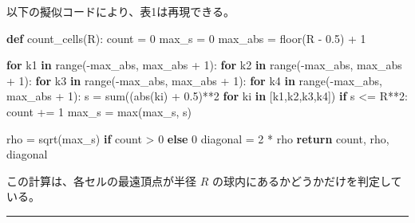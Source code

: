 \documentclass[
]{ltjsarticle}
\newenvironment{Shaded}{}{}
\newcommand{\BuiltInTok}[1]{\textcolor[rgb]{0.00,0.50,0.00}{#1}}
\newcommand{\ControlFlowTok}[1]{\textcolor[rgb]{0.00,0.44,0.13}{\textbf{#1}}}
\newcommand{\DecValTok}[1]{\textcolor[rgb]{0.25,0.63,0.44}{#1}}
\newcommand{\FloatTok}[1]{\textcolor[rgb]{0.25,0.63,0.44}{#1}}
\newcommand{\KeywordTok}[1]{\textcolor[rgb]{0.00,0.44,0.13}{\textbf{#1}}}
\newcommand{\NormalTok}[1]{#1}
\newcommand{\OperatorTok}[1]{\textcolor[rgb]{0.40,0.40,0.40}{#1}}
\begin{document}
以下の擬似コードにより、表1は再現できる。

\begin{Shaded}
\begin{Highlighting}[]
\KeywordTok{def}\NormalTok{ count\_cells(R):}
\NormalTok{    count }\OperatorTok{=} \DecValTok{0}
\NormalTok{    max\_s }\OperatorTok{=} \DecValTok{0}
\NormalTok{    max\_abs }\OperatorTok{=}\NormalTok{ floor(R }\OperatorTok{{-}} \FloatTok{0.5}\NormalTok{) }\OperatorTok{+} \DecValTok{1}

    \ControlFlowTok{for}\NormalTok{ k1 }\KeywordTok{in} \BuiltInTok{range}\NormalTok{(}\OperatorTok{{-}}\NormalTok{max\_abs, max\_abs }\OperatorTok{+} \DecValTok{1}\NormalTok{):}
      \ControlFlowTok{for}\NormalTok{ k2 }\KeywordTok{in} \BuiltInTok{range}\NormalTok{(}\OperatorTok{{-}}\NormalTok{max\_abs, max\_abs }\OperatorTok{+} \DecValTok{1}\NormalTok{):}
        \ControlFlowTok{for}\NormalTok{ k3 }\KeywordTok{in} \BuiltInTok{range}\NormalTok{(}\OperatorTok{{-}}\NormalTok{max\_abs, max\_abs }\OperatorTok{+} \DecValTok{1}\NormalTok{):}
          \ControlFlowTok{for}\NormalTok{ k4 }\KeywordTok{in} \BuiltInTok{range}\NormalTok{(}\OperatorTok{{-}}\NormalTok{max\_abs, max\_abs }\OperatorTok{+} \DecValTok{1}\NormalTok{):}
\NormalTok{            s }\OperatorTok{=} \BuiltInTok{sum}\NormalTok{((}\BuiltInTok{abs}\NormalTok{(ki) }\OperatorTok{+} \FloatTok{0.5}\NormalTok{)}\OperatorTok{**}\DecValTok{2} \ControlFlowTok{for}\NormalTok{ ki }\KeywordTok{in}\NormalTok{ [k1,k2,k3,k4])}
            \ControlFlowTok{if}\NormalTok{ s }\OperatorTok{\textless{}=}\NormalTok{ R}\OperatorTok{**}\DecValTok{2}\NormalTok{:}
\NormalTok{                count }\OperatorTok{+=} \DecValTok{1}
\NormalTok{                max\_s }\OperatorTok{=} \BuiltInTok{max}\NormalTok{(max\_s, s)}

\NormalTok{    rho }\OperatorTok{=}\NormalTok{ sqrt(max\_s) }\ControlFlowTok{if}\NormalTok{ count }\OperatorTok{\textgreater{}} \DecValTok{0} \ControlFlowTok{else} \DecValTok{0}
\NormalTok{    diagonal }\OperatorTok{=} \DecValTok{2} \OperatorTok{*}\NormalTok{ rho}
    \ControlFlowTok{return}\NormalTok{ count, rho, diagonal}
\end{Highlighting}
\end{Shaded}

この計算は、各セルの最遠頂点が半径 \(R\)
の球内にあるかどうかだけを判定している。

\begin{center}\rule{0.5\linewidth}{0.5pt}\end{center}
\end{document}
